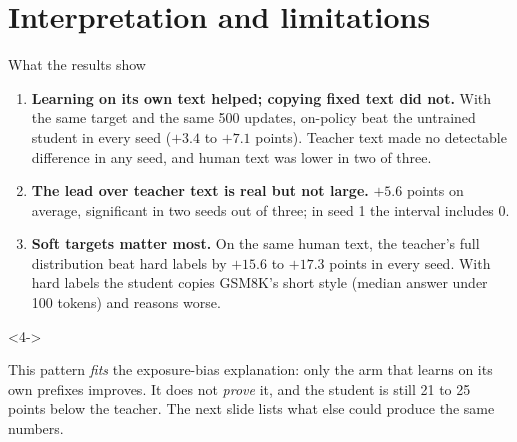 \renewcommand{\sectioninfo}{Presenters: E1 (2 min), E3 (3 min)}
\section{Interpretation and limitations}

\begin{frame}{What the results show\hfill\ours\ }
  \small
  \begin{enumerate}
    \item<1-> \textbf{Learning on its own text helped; copying fixed text did not.}
          With the same target and the same 500 updates, on-policy beat the untrained
          student in every seed ($+3.4$ to $+7.1$ points). Teacher text made no detectable
          difference in any seed, and human text was lower in two of three.
    \item<2-> \textbf{The lead over teacher text is real but not large.} $+5.6$ points on
          average, significant in two seeds out of three; in seed 1 the interval
          includes 0.
    \item<3-> \textbf{Soft targets matter most.} On the same human text, the teacher's full
          distribution beat hard labels by $+15.6$ to $+17.3$ points in every seed. With hard
          labels the student copies GSM8K's short style (median answer under 100 tokens) and
          reasons worse.
  \end{enumerate}
  \vspace{0.15cm}
  \begin{uncoverenv}<4->
  \begin{keybox}
    \footnotesize This pattern \emph{fits} the exposure-bias explanation: only the arm that
    learns on its own prefixes improves. It does not \emph{prove} it, and the student is
    still 21 to 25 points below the teacher. The next slide lists what else could produce
    the same numbers.
  \end{keybox}
  \end{uncoverenv}
\end{frame}

